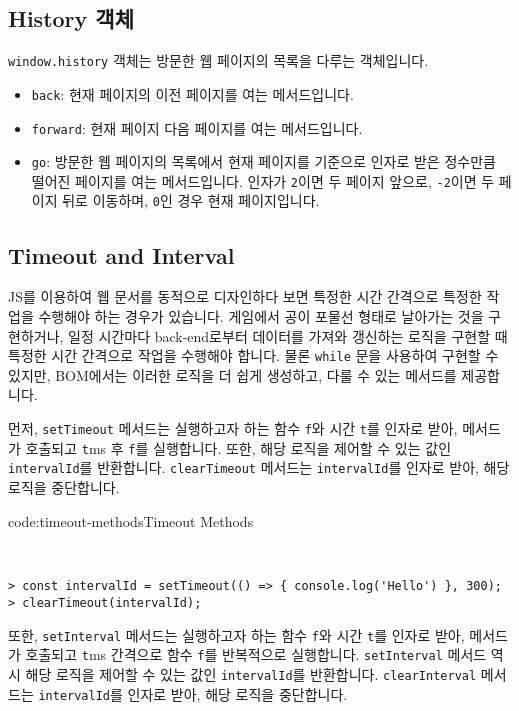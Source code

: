 \subsection*{History 객체}

\texttt{window.history} 객체는 방문한 웹 페이지의 목록을 다루는 객체입니다.

\begin{itemize}
    \item \texttt{back}: 현재 페이지의 이전 페이지를 여는 메서드입니다. 
    \item \texttt{forward}: 현재 페이지 다음 페이지를 여는 메서드입니다. 
    \item \texttt{go}: 방문한 웹 페이지의 목록에서 현재 페이지를 기준으로 인자로 받은 정수만큼 떨어진 페이지를 여는 메서드입니다. 인자가 \texttt{2}이면 두 페이지 앞으로, \texttt{-2}이면 두 페이지 뒤로 이동하며, \texttt{0}인 경우 현재 페이지입니다. 
\end{itemize}

\subsection*{Timeout and Interval}

JS를 이용하여 웹 문서를 동적으로 디자인하다 보면 특정한 시간 간격으로 특정한 작업을 수행해야 하는 경우가 있습니다. 게임에서 공이 포물선 형태로 날아가는 것을 구현하거나, 일정 시간마다 back-end로부터 데이터를 가져와 갱신하는 로직을 구현할 때 특정한 시간 간격으로 작업을 수행해야 합니다. 물론 \texttt{while} 문을 사용하여 구현할 수 있지만, BOM에서는 이러한 로직을 더 쉽게 생성하고, 다룰 수 있는 메서드를 제공합니다.

먼저, \texttt{setTimeout} 메서드는 실행하고자 하는 함수 \texttt{f}와 시간 \texttt{t}를 인자로 받아, 메서드가 호출되고 \texttt{t}ms 후 \texttt{f}를 실행합니다. 또한, 해당 로직을 제어할 수 있는 값인 \texttt{intervalId}를 반환합니다. \texttt{clearTimeout} 메서드는 \texttt{intervalId}를 인자로 받아, 해당 로직을 중단합니다.

\begin{codeenv}{code:timeout-methods}{Timeout Methods}\begin{verbatim}


> const intervalId = setTimeout(() => { console.log('Hello') }, 300);
> clearTimeout(intervalId);
\end{verbatim}
\end{codeenv}

또한, \texttt{setInterval} 메서드는 실행하고자 하는 함수 \texttt{f}와 시간 \texttt{t}를 인자로 받아, 메서드가 호출되고 \texttt{t}ms 간격으로 함수 \texttt{f}를 반복적으로 실행합니다. \texttt{setInterval} 메서드 역시 해당 로직을 제어할 수 있는 값인 \texttt{intervalId}를 반환합니다. \texttt{clearInterval} 메서드는 \texttt{intervalId}를 인자로 받아, 해당 로직을 중단합니다.


